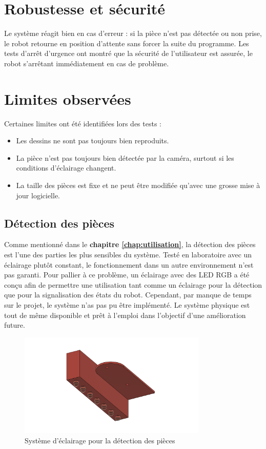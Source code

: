 \section{Robustesse et sécurité}

Le système réagit bien en cas d'erreur : si la pièce n'est pas détectée ou non prise, le robot retourne en position d'attente sans forcer la suite du programme. Les tests d'arrêt d'urgence ont montré que la sécurité de l'utilisateur est assurée, le robot s'arrêtant immédiatement en cas de problème.

\section{Limites observées}

Certaines limites ont été identifiées lors des tests :
\begin{itemize}
    \item Les dessins ne sont pas toujours bien reproduits.
    \item La pièce n'est pas toujours bien détectée par la caméra, surtout si les conditions d'éclairage changent.
    \item La taille des pièces est fixe et ne peut être modifiée qu'avec une grosse mise à jour logicielle.
\end{itemize}

\subsection{Détection des pièces}
Comme mentionné dans le \textbf{chapitre \ref{chap:utilisation}}, la détection des pièces est l'une des parties les plus sensibles du système. Testé en laboratoire avec un éclairage plutôt constant, le fonctionnement dans un autre environnement n'est pas garanti. Pour pallier à ce problème, un éclairage avec des LED RGB a été conçu afin de permettre une utilisation tant comme un éclairage pour la détection que pour la signalisation des états du robot. Cependant, par manque de temps sur le projet, le système n'as pas pu être implémenté. Le système physique est tout de même disponible et prêt à l'emploi dans l'objectif d'une amélioration future.

\begin{figure}[H]
    \centering
    \includegraphics[width=0.8\textwidth]{assets/figures/porte led v3.png}
    \caption{Système d'éclairage pour la détection des pièces}
    \label{fig:led_detection}
\end{figure}


